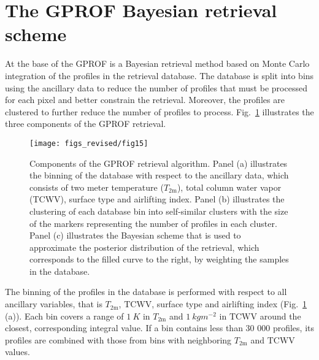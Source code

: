 \documentclass[journal abbreviation, manuscript]{copernicus}
\begin{document}



\appendix

\section{The GPROF Bayesian retrieval scheme}    %
\label{app:gprof}


At the base of the GPROF is a Bayesian retrieval method based on Monte Carlo
integration of the profiles in the retrieval database. The database is split
into bins using the ancillary data to reduce the number of profiles that must be
processed for each pixel and better constrain the retrieval. Moreover, the
profiles are clustered to further reduce the number of profiles to process.
Fig.~\ref{fig:gprof_legacy} illustrates the three components of the GPROF
retrieval.

\begin{figure}[hbpt!]
  \centering \texttt{[image: figs\_revised/fig15]}
  \caption{Components of the GPROF retrieval algorithm. Panel (a) illustrates
    the binning of the database with respect to the ancillary data, which
    consists of two meter temperature ($T_\text{2m}$), total column water vapor
    (TCWV), surface type and airlifting index. Panel (b) illustrates the
    clustering of each database bin into self-similar clusters with the size of
    the markers representing the number of profiles in each cluster. Panel (c)
    illustrates the Bayesian scheme that is used to approximate the posterior
    distribution of the retrieval, which corresponds to the filled curve to the
    right, by weighting the samples in the database. }
  \label{fig:gprof_legacy}
\end{figure}

The binning of the profiles in the database is performed with respect to all
ancillary variables, that is $T_\text{2m}$, $\text{TCWV}$, surface type and
airlifting index (Fig.~\ref{fig:gprof_legacy} (a)). Each bin covers a range of
$1\ \unit{K}$ in $T_\text{2m}$ and $1\ \unit{kg} m^{-2}$ in $\text{TCWV}$ around
the closest, corresponding integral value. If a bin contains less than 30 000 profiles, its
profiles are combined with those from bins with neighboring $T_\text{2m}$ and
$\text{TCWV}$ values.
\end{document}
